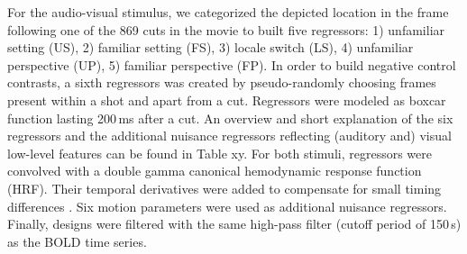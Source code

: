 \documentclass[english]{article}
\begin{document}
For the audio-visual stimulus, we categorized the depicted location in the frame following one of the 869 cuts in the movie to built five regressors: 1) unfamiliar setting (US), 2) familiar setting (FS), 3) locale switch (LS), 4) unfamiliar perspective (UP), 5) familiar perspective (FP).
In order to build negative control contrasts, a sixth regressors was created by pseudo-randomly choosing frames present within a shot and apart from a cut. Regressors were modeled as boxcar function lasting 200\,ms after a cut.
An overview and short explanation of the six regressors and the additional nuisance regressors reflecting (auditory and) visual low-level features can be found in Table xy.
For both stimuli, regressors were convolved with a double gamma canonical hemodynamic response function (HRF).
Their temporal derivatives were added to compensate for small timing differences \citep{friston1998event}.
Six motion parameters were used as additional nuisance regressors. Finally, designs were filtered with the same high-pass filter (cutoff period of 150\,s) as the BOLD time series.
\end{document}
